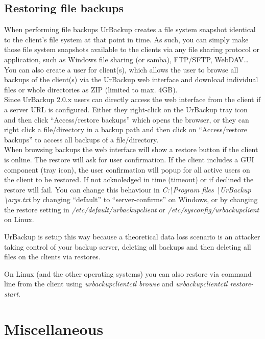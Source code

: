 \documentclass[a4paper,10pt]{article}
\begin{document}
\subsection{Restoring file backups}

When performing file backups UrBackup creates a file system snapshot identical to the client's file system at that point in time. As such, you can simply make those file system snapshots available to the clients via any file sharing protocol or application, such as Windows file sharing (or samba), FTP/SFTP, WebDAV\ldots\\

You can also create a user for client(s), which allows the user to browse all backups of the client(s) via the UrBackup web interface and download individual files or whole directories as ZIP (limited to max. 4GB).\\

Since UrBackup 2.0.x users can directly access the web interface from the client if a server URL is configured. Either they right-click on the UrBackup tray icon and then click ``Access/restore backups'' which opens the browser, or they can right click a file/directory in a backup path and then click on ``Access/restore backups'' to access all backups of a file/directory.\\

When browsing backups the web interface will show a restore button if the client is online. The restore will ask for user confirmation. If the client includes a GUI component (tray icon), the user confirmation will popup for all active users on the client to be restored. If not acknoledged in time (timeout) or if declined the restore will fail. 
You can change this behaviour in \textsl{C:\textbackslash Program files \textbackslash UrBackup \textbackslash args.txt} by changing ``default'' to ``server-confirms'' on Windows, or by changing the restore setting in \textsl{/etc/default/urbackupclient} or \textsl{/etc/sysconfig/urbackupclient} on Linux.

UrBackup is setup this way because a theoretical data loss scenario is an attacker taking control of your backup server, deleting all backups and then deleting all files on the clients via restores.  

On Linux (and the other operating systems) you can also restore via command line from the client using \textsl{urbackupclientctl browse} and \textsl{urbackupclientctl restore-start}.

\section{Miscellaneous}
\end{document}
